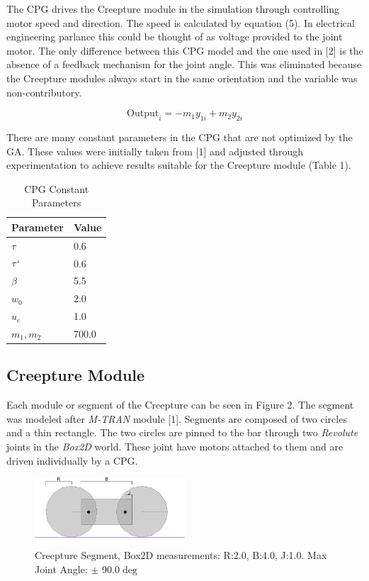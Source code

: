 \documentclass{acm_proc_article-sp}
\begin{document}
The CPG drives the Creepture module in the simulation through
controlling motor speed and direction. The speed is calculated by
equation (5). In electrical engineering parlance this could be thought
of as voltage provided to the joint motor. The only difference between
this CPG model and the one used in {[}2{]} is the absence of a feedback
mechanism for the joint angle. This was eliminated because the Creepture
modules always start in the same orientation and the variable was
non-contributory.

\begin{equation}
    \text{Output}_{i} = -m_1 y_{1i} + m_2 y_{2i} 
\end{equation}

There are many constant parameters in the CPG that are not optimized by
the GA. These values were initially taken from {[}1{]} and adjusted
through experimentation to achieve results suitable for the Creepture
module (Table 1).

\begin{table}
\centering
\caption{CPG Constant Parameters}
\begin{tabular}{|l|l|} \hline
Parameter & Value\\ \hline
$\tau$ & 0.6\\ \hline
$\tau`$ & 0.6\\ \hline
$\beta$ & 5.5\\ \hline
$w_0$ & 2.0\\ \hline
$u_e$ & 1.0\\ \hline
$m_1, m_2$ & 700.0\\ \hline
\end{tabular}
\end{table}

\subsection{Creepture Module}

Each module or segment of the Creepture can be seen in Figure 2. The
segment was modeled after \emph{M-TRAN} module {[}1{]}. Segments are
composed of two circles and a thin rectangle. The two circles are pinned
to the bar through two \emph{Revolute} joints in the \emph{Box2D} world.
These joint have motors attached to them and are driven individually by
a CPG.

\begin{figure}
\centering
\includegraphics[width=0.5\textwidth]{images/segment-annotated.png}
\caption{Creepture Segment, Box2D measurements: R:2.0, B:4.0, J:1.0. Max
Joint Angle: $\pm$ 90.0$\deg$ \label{creepturemod}}
\end{figure}
\end{document}
